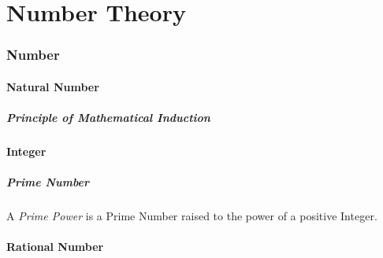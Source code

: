\part{Number Theory}\label{sec:number_theory}

\section{Number}\label{sec:number}

\subsection{Natural Number}\label{sec:natural_number}

\subsubsection{Principle of Mathematical Induction}
\label{sec:induction_principle}



\subsection{Integer}\label{sec:integer}

\subsubsection{Prime Number}\label{sec:prime_number}

A \emph{Prime Power} is a Prime Number raised to the power of a
positive Integer.



\subsection{Rational Number}\label{sec:rational}

